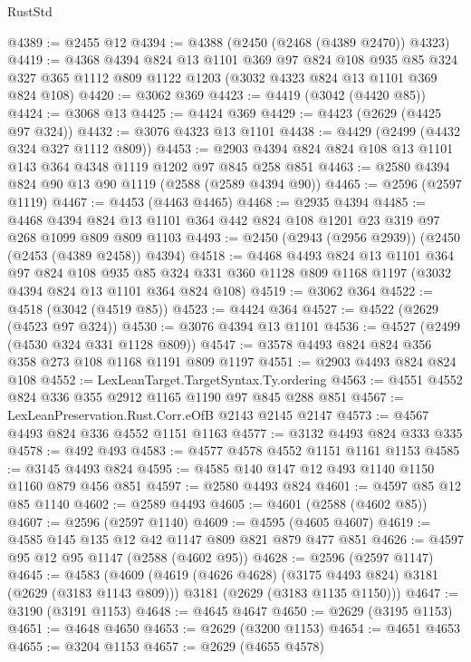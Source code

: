 \begin{lexlean}{RustStd}
\begin{coremodule}
@4389 := @2455 @12
@4394 := @4388 (@2450 (@2468 (@4389 @2470)) @4323)
@4419 := @4368
    @4394
    @824
    @13
    @1101
    @369
    @97
    @824
    @108
    @935
    @85
    @324
    @327
    @365
    @1112
    @809
    @1122
    @1203
    (@3032 @4323 @824 @13 @1101 @369 @824 @108)
@4420 := @3062 @369
@4423 := @4419 (@3042 (@4420 @85))
@4424 := @3068 @13
@4425 := @4424 @369
@4429 := @4423 (@2629 (@4425 @97 @324))
@4432 := @3076 @4323 @13 @1101
@4438 := @4429 (@2499 (@4432 @324 @327 @1112 @809))
@4453 := @2903 @4394 @824 @824 @108 @13 @1101 @143 @364 @4348 @1119 @1202 @97 @845 @258 @851
@4463 := @2580 @4394 @824 @90 @13 @90 @1119 (@2588 (@2589 @4394 @90))
@4465 := @2596 (@2597 @1119)
@4467 := @4453 (@4463 @4465)
@4468 := @2935 @4394
@4485 := @4468
    @4394
    @824
    @13
    @1101
    @364
    @442
    @824
    @108
    @1201
    @23
    @319
    @97
    @268
    @1099
    @809
    @809
    @1103
@4493 := @2450 (@2943 (@2956 @2939)) (@2450 (@2453 (@4389 @2458)) @4394)
@4518 := @4468
    @4493
    @824
    @13
    @1101
    @364
    @97
    @824
    @108
    @935
    @85
    @324
    @331
    @360
    @1128
    @809
    @1168
    @1197
    (@3032 @4394 @824 @13 @1101 @364 @824 @108)
@4519 := @3062 @364
@4522 := @4518 (@3042 (@4519 @85))
@4523 := @4424 @364
@4527 := @4522 (@2629 (@4523 @97 @324))
@4530 := @3076 @4394 @13 @1101
@4536 := @4527 (@2499 (@4530 @324 @331 @1128 @809))
@4547 := @3578 @4493 @824 @824 @356 @358 @273 @108 @1168 @1191 @809 @1197
@4551 := @2903 @4493 @824 @824 @108
@4552 := LexLeanTarget.TargetSyntax.Ty.ordering
@4563 := @4551 @4552 @824 @336 @355 @2912 @1165 @1190 @97 @845 @288 @851
@4567 := LexLeanPreservation.Rust.Corr.eOfB @2143 @2145 @2147
@4573 := @4567 @4493 @824 @336 @4552 @1151 @1163
@4577 := @3132 @4493 @824 @333 @335
@4578 := @492 @493
@4583 := @4577 @4578 @4552 @1151 @1161 @1153
@4585 := @3145 @4493 @824
@4595 := @4585 @140 @147 @12 @493 @1140 @1150 @1160 @879 @456 @851
@4597 := @2580 @4493 @824
@4601 := @4597 @85 @12 @85 @1140
@4602 := @2589 @4493
@4605 := @4601 (@2588 (@4602 @85))
@4607 := @2596 (@2597 @1140)
@4609 := @4595 (@4605 @4607)
@4619 := @4585 @145 @135 @12 @42 @1147 @809 @821 @879 @477 @851
@4626 := @4597 @95 @12 @95 @1147 (@2588 (@4602 @95))
@4628 := @2596 (@2597 @1147)
@4645 := @4583
    (@4609
      (@4619 (@4626 @4628) (@3175 @4493 @824) @3181 (@2629 (@3183 @1143 @809)))
      @3181
      (@2629 (@3183 @1135 @1150)))
@4647 := @3190 (@3191 @1153)
@4648 := @4645 @4647
@4650 := @2629 (@3195 @1153)
@4651 := @4648 @4650
@4653 := @2629 (@3200 @1153)
@4654 := @4651 @4653
@4655 := @3204 @1153
@4657 := @2629 (@4655 @4578)

\end{coremodule}
\end{lexlean}
